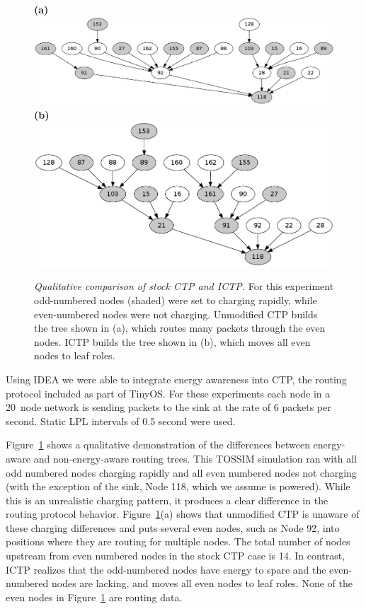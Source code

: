 \begin{figure}[t]
\begin{center}
\textbf{(a)}\\
\includegraphics[width=\hsize]{./figs/STOCK.png}\\
\textbf{(b)}\\
\includegraphics[width=\hsize]{./figs/ICTP.png}\\
\end{center}

\caption{\textit{Qualitative comparison of stock CTP and ICTP.} For this
experiment odd-numbered nodes (shaded) were set to charging rapidly, while
even-numbered nodes were not charging. Unmodified CTP builds the tree shown
in (a), which routes many packets through the even nodes. ICTP builds the
tree shown in (b), which moves all even nodes to leaf roles.}

\label{fig-ictpqualitative}
\end{figure}

Using IDEA we were able to integrate energy awareness into CTP, the routing
protocol included as part of TinyOS. For these experiments each node in a
20~node network is sending packets to the sink at the rate of 6 packets per
second. Static LPL intervals of 0.5 second were used. 

Figure~\ref{fig-ictpqualitative} shows a qualitative demonstration of the
differences between energy-aware and non-energy-aware routing trees. This
TOSSIM simulation ran with all odd numbered nodes charging rapidly and all
even numbered nodes not charging (with the exception of the sink, Node 118,
which we assume is powered). While this is an unrealistic charging pattern,
it produces a clear difference in the routing protocol behavior.
Figure~\ref{fig-ictpqualitative}(a) shows that unmodified CTP is unaware of
these charging differences and puts several even nodes, such as Node 92, into
positions where they are routing for multiple nodes. The total number of
nodes upstream from even numbered nodes in the stock CTP case is 14. In
contrast, ICTP realizes that the odd-numbered nodes have energy to spare and
the even-numbered nodes are lacking, and moves all even nodes to leaf roles.
None of the even nodes in Figure~\ref{fig-ictpqualitative} are routing data.

